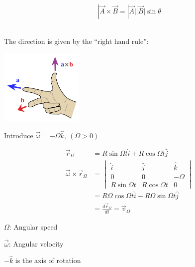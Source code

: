 \documentclass[10pt]{scrartcl}
\begin{document}
\begin{center}
  \end{center}
  \[|\vec{A} \times \vec{B} = |\vec{A}||\vec{B}|\sin\theta\]~
  
  The direction is given by the ``right hand rule'':
  \begin{center}
  \includegraphics[width = 4cm]{right.png}	
  \end{center}

  
  \begin{example}
  Introduce $\vec{\omega} = -\Omega\hat{k},~(\Omega > 0)$
  
  \[
  \begin{aligned}
  \vec{r}_\Omega &= R\sin\Omega t\hat{i} + R\cos\Omega t\hat{j}\\
  \vec{\omega} \times \vec{r}_\Omega &= 
  \begin{vmatrix}
 \hat{i} & \hat{j} & \hat{k} \\
 0 & 0 & -\Omega \\
 R\sin\Omega t & R\cos\Omega t & 0 	
 \end{vmatrix}\\
 &= R\Omega \cos\Omega t\hat{i} -R\Omega \sin\Omega t\hat{j}\\
 &= \frac{d\vec{r}_\Omega}{dt} = \vec{v}_\Omega 
  \end{aligned}
  \]	
 

 $\Omega$: Angular speed
 
 $\vec{\omega}$: Angular velocity
 
 $-\hat{k}$ is the axis of rotation
  \end{example}
  
\end{document}
